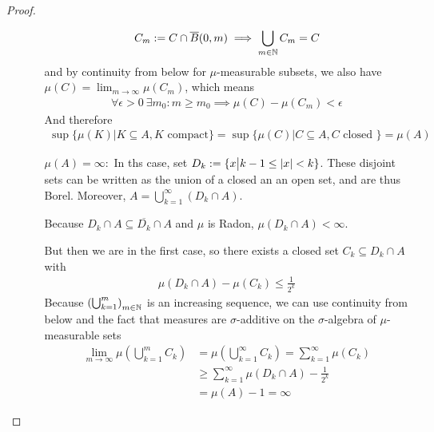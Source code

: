 \begin{proof}
\begin{enumerate}
\begin{enumerate}
        \begin{align*}
          C_m := C \cap \overline{B}(0,m) \implies \bigcup_{m \in \mathbb{N}} C_m = C
        \end{align*}
        and by continuity from below for $\mu$-measurable subsets, we also have $\mu(C) = \lim_{m \to \infty} \mu(C_m)$, which means
        \begin{align*}
          \forall  \epsilon > 0\ \exists m_0: m \geq m_0 \implies \mu(C) - \mu(C_m) < \epsilon
        \end{align*}
        And therefore 
        \begin{align*}
          \sup \{\mu(K) \big\vert K \subseteq A, K \text{ compact}\}
          =
          \sup \{\mu(C) \big\vert C \subseteq A, C \text{ closed } \}
          = \mu(A)
        \end{align*}


      \item[$\mu(A) = \infty:$] In ths case, set $D_k := \{x \big\vert k-1 \leq \vert x\vert < k\}$. These disjoint sets can be written as the union of a closed an an open set, and are thus Borel.
        Moreover,
        $A = \bigcup_{k=1}^{\infty}(D_k \cap A)$.

        Because $D_k \cap A \subseteq \overline{D_k} \cap A$ and $\mu$ is Radon, $\mu(D_k \cap A) < \infty$.

        But then we are in the first case, so there exists a closed set $C_k \subseteq D_k \cap A$ with
        \begin{align*}
          \mu(D_k \cap A) - \mu(C_k) \leq \frac{1}{2^{k}}
        \end{align*}
        Because $\left(
          \bigcup_{k=1}^{m}
        \right)_{m \in \mathbb{N}}$ is an increasing sequence, we can use continuity from below and the fact that measures are $\sigma$-additive on the $\sigma$-algebra of $\mu$-measurable sets
        \begin{align*}
          \lim_{m \to \infty} \mu \left(
            \bigcup_{k=1}^{m}C_k
          \right) 
          &=
          \mu \left(
            \bigcup_{k=1}^{\infty}C_k
          \right)
          = \sum_{k=1}^{\infty} \mu(C_k)
          \\
          &\geq \sum_{k=1}^{\infty} \mu(D_k \cap A) - \frac{1}{2^{k}}\\
          &= \mu(A) - 1 = \infty
        \end{align*}




        
    \end{enumerate}


\end{enumerate}
\end{proof}


